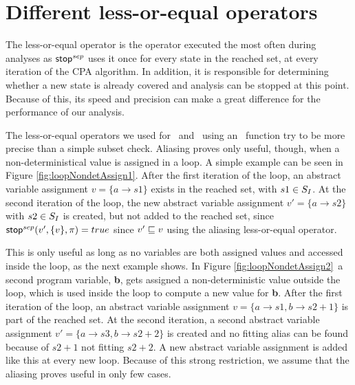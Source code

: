 \section{Different less-or-equal operators}
\label{sec:leqOperators}
The less-or-equal operator is the operator executed the most often during analyses as $\operatorname{\operatorname{\mathsf{stop}}}^{sep}$ uses it once for every state in the reached set, at every iteration of the CPA algorithm.
In addition, it is responsible for determining whether a new state is already covered and analysis can be stopped at this point.
Because of this, its speed and precision can make a great difference for the performance of our analysis.

The  less-or-equal operators we used for \symbolicValueAnalysisCPA\ and \constraintsCPA\ using an \aliasFunc\ function try to be more precise than a simple subset check.
Aliasing proves only useful, though, when a non-deterministical value is assigned in a loop. A simple example can be seen in Figure \ref{fig:loopNondetAssign1}.
After the first iteration of the loop, an abstract variable assignment $v = \{ a \rightarrow s1 \}$ exists in the reached set, with $s1 \in S_I$.
At the second iteration of the loop, the new abstract variable assignment $v' = \{ a \rightarrow s2 \}$ with $s2 \in S_I$ is created, but not added to the reached set, since $\operatorname{\operatorname{\mathsf{stop}}}^{sep}(v', \{ v \}, \pi) = true$ since $v' \sqsubseteq v$ using the aliasing less-or-equal operator.

This is only useful as long as no variables are both assigned values and accessed inside the loop, as the next example shows. In Figure \ref{fig:loopNondetAssign2}\ a second program variable, \textbf{b}, gets assigned a non-deterministic value outside the loop, which is used inside the loop to compute a new value for \textbf{b}.
After the first iteration of the loop, an abstract variable assignment $v = \{ a \rightarrow s1, b \rightarrow s2 + 1 \}$ is part of the reached set.
At the second iteration, a second abstract variable assignment $v' = \{ a \rightarrow s3, b \rightarrow s2 + 2 \}$ is created and no fitting alias can be found because of $s2 + 1$ not fitting $s2 + 2$.
A new abstract variable assignment is added like this at every new loop.
Because of this strong restriction, we assume that the aliasing proves useful in only few cases.

